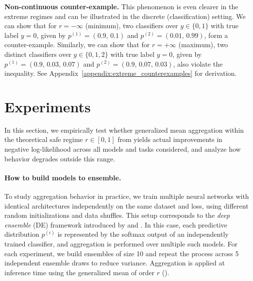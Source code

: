 \documentclass[accepted]{uai2026} %
\begin{document}




\textbf{Non-continuous counter-example.} This phenomenon is even clearer in the extreme regimes and can be illustrated in the discrete (classification) setting.
We can show that for $r=-\infty$ (minimum), two classifiers over $y\in\{0,1\}$ with true label $y=0$, 
given by $p^{(1)}=(0.9,\,0.1)$ and $p^{(2)}=(0.01,\,0.99)$, form a counter-example.
Similarly, we can show that for $r=+\infty$ (maximum), two distinct classifiers over $y\in\{0,1,2\}$ with true label $y=0$, 
given by $p^{(1)}=(0.9,\,0.03,\,0.07)$ and $p^{(2)}=(0.9,\,0.07,\,0.03)$, also violate the inequality. See Appendix~\ref{appendix:extreme_counterexamples} for derivation.




\section{Experiments}\label{section: experiments}

In this section, we empirically test whether generalized mean aggregation within the theoretical safe regime $r \in [0,1]$ from  yields actual improvements in negative log-likelihood across all models and tasks considered, and analyze how behavior degrades outside this range.
\paragraph{How to build models to ensemble.}To study aggregation behavior in practice, we train multiple neural networks with identical architectures independently on the same dataset and loss, using different random initializations and data shuffles. This setup corresponds to the \textit{deep ensemble} (DE) framework introduced by \citet{lakshminarayanan2017simple} and \citet{fort2019deep}. In this case, each predictive distribution $p^{(i)}$ is represented by the softmax output of an independently trained classifier, and aggregation is performed over multiple such models. For each experiment, we build ensembles of size 10 and repeat the process across 5 independent ensemble draws to reduce variance. Aggregation is applied at inference time using the generalized mean of order $r$ ().
\end{document}
